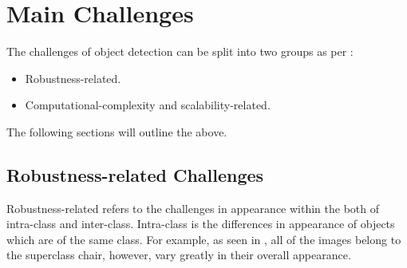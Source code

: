 \section{Main Challenges}\label{sec:probchallenges}
The challenges of object detection can be split into two groups as per \cite{zhang}:

\begin{itemize}
	\item Robustness-related.
	\item Computational-complexity and scalability-related.
\end{itemize}

The following sections will outline the above.

\subsection{Robustness-related Challenges}

Robustness-related refers to the challenges in appearance within the both of intra-class and inter-class. Intra-class is the differences in appearance of objects which are of the same class. For example, as seen in , all of the images belong to the superclass chair, however, vary greatly in their overall appearance. 

